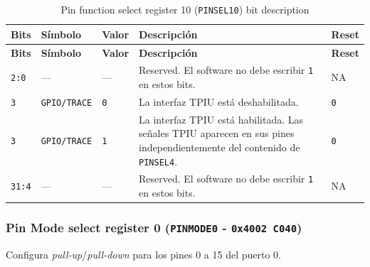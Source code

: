 \begin{longtable}{|>{\raggedright\arraybackslash}p{}|>{\raggedright\arraybackslash}p{}|>{\raggedright\arraybackslash}p{}|>{\raggedright\arraybackslash}p{}|>{\centering\arraybackslash}p{}|}
\caption{Pin function select register 10 (\texttt{PINSEL10}) bit description}\\
\hline
\textbf{Bits} & \textbf{Símbolo} & \textbf{Valor} & \textbf{Descripción} & \textbf{Reset} \\
\hline
\endfirsthead
\hline
\textbf{Bits} & \textbf{Símbolo} & \textbf{Valor} & \textbf{Descripción} & \textbf{Reset} \\
\hline
\endhead
\texttt{2:0} & --- & --- & Reserved. El software no debe escribir \texttt{1} en estos bits. & NA \\
\hline
\texttt{3} & \texttt{GPIO/TRACE} & \texttt{0} & La interfaz TPIU está deshabilitada. & \texttt{0} \\
\hline
\texttt{3} & \texttt{GPIO/TRACE} & \texttt{1} & La interfaz TPIU está habilitada. Las señales TPIU aparecen en sus pines independientemente del contenido de \texttt{PINSEL4}. & \texttt{0} \\
\hline
\texttt{31:4} & --- & --- & Reserved. El software no debe escribir \texttt{1} en estos bits. & NA \\
\hline
\end{longtable}

\subsubsection{Pin Mode select register 0 (\texttt{PINMODE0} - \texttt{0x4002 C040})}
Configura \textit{pull-up}/\textit{pull-down} para los pines 0 a 15 del puerto 0.

